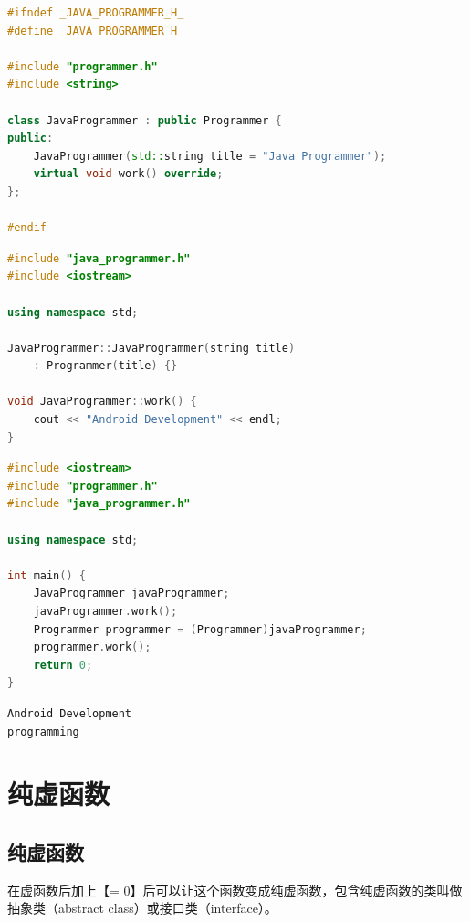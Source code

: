 \begin{lstlisting}[language=C++, title=java\_programmer.h]
#ifndef _JAVA_PROGRAMMER_H_
#define _JAVA_PROGRAMMER_H_

#include "programmer.h"
#include <string>

class JavaProgrammer : public Programmer {
public:
	JavaProgrammer(std::string title = "Java Programmer");
	virtual void work() override;
};

#endif
\end{lstlisting}

\begin{lstlisting}[language=C++, title=java\_programmer.cpp]
#include "java_programmer.h"
#include <iostream>

using namespace std;

JavaProgrammer::JavaProgrammer(string title) 
	: Programmer(title) {}

void JavaProgrammer::work() {
	cout << "Android Development" << endl;
}
\end{lstlisting}

\begin{lstlisting}[language=C++, title=test\_programmer.cpp]
#include <iostream>
#include "programmer.h"
#include "java_programmer.h"

using namespace std;

int main() {
	JavaProgrammer javaProgrammer;
	javaProgrammer.work();
	Programmer programmer = (Programmer)javaProgrammer;
	programmer.work();
	return 0;
}
\end{lstlisting}

\begin{tcolorbox}
	\begin{verbatim}
Android Development
programming
	\end{verbatim}
\end{tcolorbox}

\newpage

\section{纯虚函数}

\subsection{纯虚函数}

在虚函数后加上【= 0】后可以让这个函数变成纯虚函数，包含纯虚函数的类叫做抽象类（abstract class）或接口类（interface）。\\

